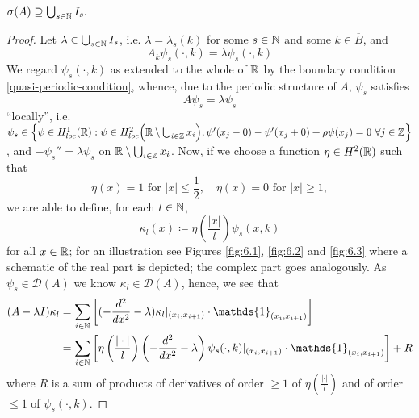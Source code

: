 \begin{theorem} \label{4.1:thm-MainResult.FirstInclusion}
	$\sigma(A) \supseteq \bigcup_{s \in \mathbb{N}} I_{s}.$
	
	\begin{proof}
		Let $\lambda \in \bigcup_{s \in \mathbb{N}} I_{s}$, i.e. $\lambda = \lambda_{s}(k)$ for some $s \in \mathbb{N}$ and some $k \in \overline{B}$, and 
		\begin{equation}
			A_{k} \psi_{s}(\cdot, k) = \lambda \psi_{s}(\cdot, k) \label{firstinclusion-firstequation} 
		\end{equation} 
		We regard $\psi_{s}(\cdot, k)$ as extended to the whole of $\mathbb{R}$ by the boundary condition \eqref{quasi-periodic-condition}, whence, due to the periodic structure of $A$, $\psi_{s}$ satisfies
		\[ A \psi_{s} = \lambda \psi_{s} \]
		\enquote{locally}, i.e. $\psi_{s} \in \Big\{ \psi \in  H^{1}_{loc}(\mathbb{R}) : \psi \in H^{2}_{loc}\Big(\mathbb{R} \setminus \bigcup_{i \in \mathbb{Z}} x_{i} \Big), \psi'(x_{j} - 0) - \psi'(x_{j} + 0) + \rho  \psi(x_{j}) = 0 ~\forall j \in \mathbb{Z} \Big\}$, and $ -\psi_{s}'' = \lambda \psi_{s}$ on $\mathbb{R} \setminus \bigcup_{i \in \mathbb{Z}} x_{i}$. Now, if we choose a function $\eta \in H^{2}(\mathbb{R})$ such that 
			\begin{equation}
				\eta(x) = 1 \text{ for } |x| \leq \frac{1}{2}, \quad \eta(x) = 0 \text{ for } |x| \geq 1, \label{eta}
			\end{equation} 
		we are able to define, for each $l \in \mathbb{N}$,
			\[ \kappa_{l}(x) \coloneqq \eta\left(\frac{|x|}{l}\right) \psi_{s}(x, k) \]		
	 	for all $x \in \mathbb{R}$; for an illustration see Figures \ref{fig:6.1}, \ref{fig:6.2} and \ref{fig:6.3} where a schematic of the real part is depicted; the complex part goes analogously. As $\psi_{s} \in \mathcal{D}(A)$ we know $\kappa_{l} \in \mathcal{D}(A)$, hence, we see that
		\begin{align}
			(A - \lambda I) \kappa_{l} & = \sum_{i \in \N} \left[ (- \frac{d^{2}}{dx^{2}} - \lambda) \kappa_{l}|_{(x_{i}, x_{i+1})} \cdot \mathds{1}_{(x_{i}, x_{i+1})} \right] \label{eq:sepofspectraleq} \\
				& = \sum_{i \in \N} \left[ \eta\left(\frac{|\cdot|}{l}\right) \left(- \frac{d^{2}}{dx^{2}} - \lambda \right) \psi_{s}(\cdot, k) |_{(x_{i}, x_{i+1})} \cdot \mathds{1}_{(x_{i}, x_{i+1})} \right] + R \notag
		\end{align}
		where $R$ is a sum of products of derivatives of order $\geq 1$ of $\eta\left(\frac{|\cdot|}{l}\right)$ and of order $\leq 1$ of $\psi_{s}(\cdot, k)$. 
		

\end{proof}
\end{theorem}
